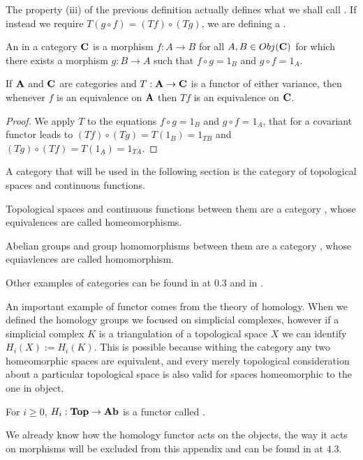 \documentclass[../1.tex]{subfiles}
\begin{document}
    The property (iii) of the previous definition actually defines what we shall call .
    If instead we require $T(g \circ f) = (Tf) \circ (Tg)$, we are defining a .

    \begin{defn}
        An  in a category $\textbf{C}$ is a morphism $f : A \to B$ for all $A,B \in Obj(\textbf{C})$ for which there exists a morphism $g : B \to A$ such that
        $ f \circ g = 1_B$ and $ g \circ f = 1_A$.
    \end{defn}

    \begin{thm}
        If $\textbf{A}$ and $\textbf{C}$ are categories and $T : \textbf{A} \to \textbf{C}$ is a functor of either variance, then whenever $f$ is 
        an equivalence on $\textbf{A}$ then $Tf$ is an equivalence on $\textbf{C}$.
    \end{thm}
    \begin{proof}
        We apply $T$ to the equations $ f \circ g = 1_B$ and $ g \circ f = 1_A$, that for a covariant functor leads to 
        $(Tf) \circ (Tg) = T(1_B) = 1_{TB}$ and $(Tg) \circ (Tf) = T(1_A) = 1_{TA}$.
    \end{proof}

    A category that will be used in the following section is the category of topological spaces and continuous functions.

    \begin{prop}
        Topological spaces and continuous functions between them are a category , whose equivalences are called homeomorphisms.
    \end{prop}

    {\color{blue}
    \begin{prop}
        Abelian groups and group homomorphisms between them are a category , whose equiavlences are called homomorphism.
    \end{prop}

    Other examples of categories can be found in \cite{rotman} at 0.3 and in \cite{mclane}.

    An important example of functor comes from the theory of homology.
    When we defined the homology groups we focused on simplicial complexes, however if a simplicial complex $K$ is a triangulation of a topological space $X$
    we can identify $H_i(X) := H_i(K)$. This is possible because withing the category  any two homeomorphic spaces are equivalent, and every merely topological consideration
    about a particular topological space is also valid for spaces homeomorphic to the one in object.

    \begin{thm}
        For $i \geq 0$, $H_i : \textbf{Top} \to \textbf{Ab}$ is a functor called .
    \end{thm}

    We already know how the homology functor acts on the objects, the way it acts on morphisms will be excluded from this appendix and can be found in 
    \cite{rotman} at $4.3$.}
\end{document}
